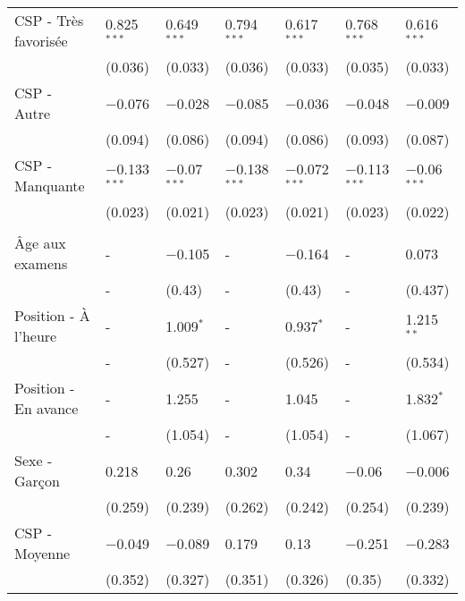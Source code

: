 \documentclass[
]{book}
\begin{document}
\begin{ThreePartTable}
\begin{longtable}[t]{lllllll}
\hspace{1em}CSP - Très favorisée & 0.825$^{***}$ & 0.649$^{***}$ & 0.794$^{***}$ & 0.617$^{***}$ & 0.768$^{***}$ & 0.616$^{***}$\\
\hspace{1em} & (0.036) & (0.033) & (0.036) & (0.033) & (0.035) & (0.033)\\
\hspace{1em}CSP - Autre & $-$0.076 & $-$0.028 & $-$0.085 & $-$0.036 & $-$0.048 & $-$0.009\\
\hspace{1em} & (0.094) & (0.086) & (0.094) & (0.086) & (0.093) & (0.087)\\
\hspace{1em}CSP - Manquante & $-$0.133$^{***}$ & $-$0.07$^{***}$ & $-$0.138$^{***}$ & $-$0.072$^{***}$ & $-$0.113$^{***}$ & $-$0.06$^{***}$\\
\hspace{1em} & (0.023) & (0.021) & (0.023) & (0.021) & (0.023) & (0.022)\\
\addlinespace[0.3em]
\multicolumn{7}{l}{\textbf{Moyenne chez les pairs}}\\
\hspace{1em}Âge aux examens & - & $-$0.105 & - & $-$0.164 & - & 0.073\\
\hspace{1em} & - & (0.43) & - & (0.43) & - & (0.437)\\
\hspace{1em}Position - À l'heure & - & 1.009$^{*}$ & - & 0.937$^{*}$ & - & 1.215$^{**}$\\
\hspace{1em} & - & (0.527) & - & (0.526) & - & (0.534)\\
\hspace{1em}Position - En avance & - & 1.255 & - & 1.045 & - & 1.832$^{*}$\\
\hspace{1em} & - & (1.054) & - & (1.054) & - & (1.067)\\
\hspace{1em}Sexe - Garçon & 0.218 & 0.26 & 0.302 & 0.34 & $-$0.06 & $-$0.006\\
\hspace{1em} & (0.259) & (0.239) & (0.262) & (0.242) & (0.254) & (0.239)\\
\hspace{1em}CSP - Moyenne & $-$0.049 & $-$0.089 & 0.179 & 0.13 & $-$0.251 & $-$0.283\\
\hspace{1em} & (0.352) & (0.327) & (0.351) & (0.326) & (0.35) & (0.332)\\

\end{longtable}
\end{ThreePartTable}
\end{document}
